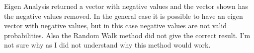\documentclass[11pt]{article}
\begin{document}
Eigen Analysis returned a vector with negative values and the vector shown has the negative values  removed. In the general case it is possible to have an eigen vector with negative values, but in this case negative values are not valid probabilities. Also the Random Walk method did not give the correct result. I'm not sure why as I did not understand why this method would work.
\end{document}
